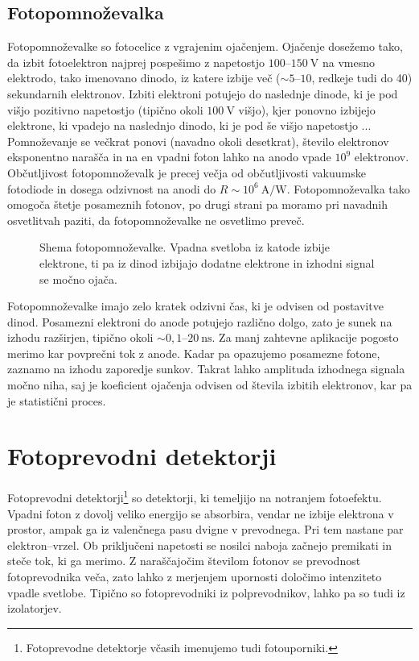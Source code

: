\subsection*{Fotopomnoževalka}
Fotopomnoževalke so fotocelice z vgrajenim ojačenjem. Ojačenje dosežemo tako, da 
izbit fotoelektron najprej pospešimo z napetostjo $100$--$150~\si{\volt}$ na vmesno elektrodo, 
tako imenovano dinodo, iz katere izbije več ($\sim 5$--$10$, redkeje tudi do 40) 
sekundarnih elektronov. Izbiti elektroni
potujejo do naslednje dinode, ki je pod višjo pozitivno napetostjo (tipično okoli $100~\si{\volt}$
višjo), kjer ponovno izbijejo elektrone, ki vpadejo na naslednjo dinodo, 
ki je pod še višjo napetostjo ... 
Pomnoževanje se večkrat ponovi (navadno okoli desetkrat),
število elektronov eksponentno narašča in na en vpadni foton lahko na anodo vpade $10^9$ elektronov. 
Občutljivost fotopomnoževalk je  precej večja od občutljivosti vakuumske fotodiode in
dosega odzivnost na anodi do $R\sim 10^6~\si{\ampere/\watt}$.
Fotopomnoževalka tako omogoča štetje posameznih fotonov, po drugi strani pa moramo pri 
navadnih osvetlitvah paziti, da fotopomnoževalke ne osvetlimo preveč. 
\begin{figure}[h]
\centering
\def\svgwidth{80truemm} 

\caption{Shema fotopomnoževalke. Vpadna svetloba iz katode izbije elektrone, ti pa 
iz dinod izbijajo dodatne elektrone in izhodni signal se močno ojača.}
\label{fig:PMT}
\end{figure}

Fotopomnoževalke imajo zelo kratek odzivni čas, ki je odvisen od postavitve dinod. Posamezni 
elektroni do anode potujejo različno dolgo, zato je sunek na izhodu 
razširjen, tipično okoli $\sim 0,1$--$20~\si{\nano\second}$.  
Za manj zahtevne aplikacije pogosto merimo kar povprečni tok z anode. Kadar pa opazujemo
posamezne fotone, zaznamo na izhodu zaporedje sunkov. Takrat lahko 
amplituda izhodnega signala močno niha, saj je koeficient ojačenja 
odvisen od števila izbitih elektronov, kar pa je statistični proces. 

\section{Fotoprevodni detektorji}
Fotoprevodni detektorji\footnote{Fotoprevodne detektorje včasih imenujemo tudi fotouporniki.} 
so detektorji, ki temeljijo na notranjem fotoefektu.
Vpadni foton z dovolj veliko energijo se absorbira, vendar ne izbije elektrona v prostor, 
ampak ga iz valenčnega pasu dvigne v prevodnega. Pri tem nastane par elektron--vrzel. 
Ob priključeni napetosti se nosilci naboja začnejo premikati in steče tok, 
ki ga merimo. Z naraščajočim številom fotonov se prevodnost fotoprevodnika veča, 
zato lahko z merjenjem upornosti določimo 
intenziteto vpadle svetlobe. Tipično so fotoprevodniki iz polprevodnikov, 
lahko pa so tudi iz izolatorjev. 

